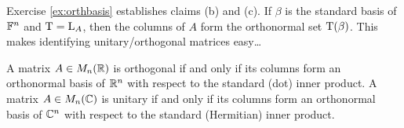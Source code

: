 Exercise \ref{ex:orthbasis} establishes claims (b) and (c). If $\beta$ is the standard basis of $\mathbb{F}^n$ and $\mathrm{T}=\mathrm{L}_A$, then the columns of $A$ form the orthonormal set $\mathrm{T}(\beta)$. This makes identifying unitary/orthogonal matrices easy\ldots


\begin{cor}{}{}
	A matrix $A\in M_n(\mathbb{R})$ is orthogonal if and only if its columns form an orthonormal basis of $\mathbb{R}^n$ with respect to the standard (dot) inner product.\smallbreak
	A matrix $A\in M_n(\mathbb{C})$ is unitary if and only if its columns form an orthonormal basis of $\mathbb{C}^n$ with respect to the standard (Hermitian) inner product.
\end{cor}



\pagebreak[3]


